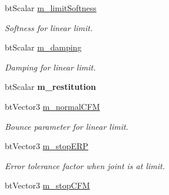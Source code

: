 \begin{DoxyCompactItemize}
\item 
bt\+Scalar \hyperlink{classbt_translational_limit_motor_aa557a6c4d83ca5cb5a942f8f4b236f74}{m\+\_\+limit\+Softness}
\begin{DoxyCompactList}\small\item\em Softness for linear limit. \end{DoxyCompactList}\item 
\hypertarget{classbt_translational_limit_motor_ae82a9f720aca3ddba4b174f2dd3a2fd2}{bt\+Scalar \hyperlink{classbt_translational_limit_motor_ae82a9f720aca3ddba4b174f2dd3a2fd2}{m\+\_\+damping}}\label{classbt_translational_limit_motor_ae82a9f720aca3ddba4b174f2dd3a2fd2}

\begin{DoxyCompactList}\small\item\em Damping for linear limit. \end{DoxyCompactList}\item 
\hypertarget{classbt_translational_limit_motor_ae456444a651dc2fa323055b130d0511e}{bt\+Scalar {\bfseries m\+\_\+restitution}}\label{classbt_translational_limit_motor_ae456444a651dc2fa323055b130d0511e}

\item 
bt\+Vector3 \hyperlink{classbt_translational_limit_motor_a8970a726c2b50a0c60c0c8e079cc784f}{m\+\_\+normal\+C\+F\+M}
\begin{DoxyCompactList}\small\item\em Bounce parameter for linear limit. \end{DoxyCompactList}\item 
\hypertarget{classbt_translational_limit_motor_a0320a9d4a9a46e7b8626ccd84f970228}{bt\+Vector3 \hyperlink{classbt_translational_limit_motor_a0320a9d4a9a46e7b8626ccd84f970228}{m\+\_\+stop\+E\+R\+P}}\label{classbt_translational_limit_motor_a0320a9d4a9a46e7b8626ccd84f970228}

\begin{DoxyCompactList}\small\item\em Error tolerance factor when joint is at limit. \end{DoxyCompactList}\item 
bt\+Vector3 \hyperlink{classbt_translational_limit_motor_a531c6ae0a0805eaa4fc59a40982a67f8}{m\+\_\+stop\+C\+F\+M}
\end{DoxyCompactItemize}



